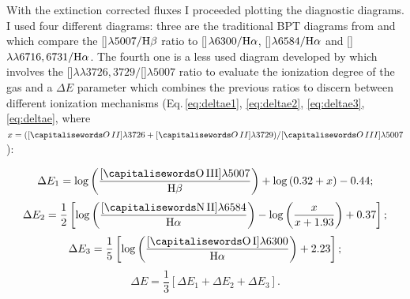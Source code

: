 \documentclass[../thesis.tex]{subfiles}
\begin{document}
With the extinction corrected fluxes I proceeded plotting the diagnostic diagrams.
I used four different diagrams: three are the traditional BPT diagrams from \citet{Baldwin81} and \citet{Veilleux87} which compare the []$\lambda5007/\rm H\beta$ ratio to []$\lambda6300/\rm H\alpha$, []$\lambda6584/\rm H\alpha$ and []$\lambda\lambda6716,6731/\rm H\alpha$.
The fourth one is a less used diagram developed by \citet{Baldwin81} which involves the []$\lambda\lambda3726,3729/$[]$\lambda5007$ ratio to evaluate the ionization degree of the gas and a $\Delta E$ parameter which combines the previous ratios to discern between different ionization mechanisms (Eq.\,\ref{eq:deltae1}, \ref{eq:deltae2}, \ref{eq:deltae3}, \ref{eq:deltae}, where $x=([\ion{O}{II}]\lambda3726+[\ion{O}{II}]\lambda3729)/[\ion{O}{III}]\lambda5007$):


\begin{equation}
\label{eq:deltae1}
\Delta E_1=\log\left(\frac{\rm[\ion{O}{III}]\lambda5007}{\rm \Hb}\right)+\log\left(0.32+x\right)-0.44;
\end{equation}
\begin{equation}
\label{eq:deltae2}
\Delta E_2= \frac{1}{2}\left[\log\left(\frac{\rm[\ion{N}{II}]\lambda6584}{\rm \Ha}\right)-\log\left(\frac{x}{x+1.93}\right) + 0.37\right];
\end{equation}
\begin{equation}
\label{eq:deltae3}
\Delta E_3=\frac{1}{5}\left[\log\left(\frac{\rm  [\ion{O}{I}]\lambda6300}{\rm \Ha}\right)+2.23\right];
\end{equation}
\begin{equation}
\label{eq:deltae}
\Delta E=\frac{1}{3}\left[\Delta E_1+\Delta E_2+\Delta E_3 \right].
\end{equation}
\end{document}
